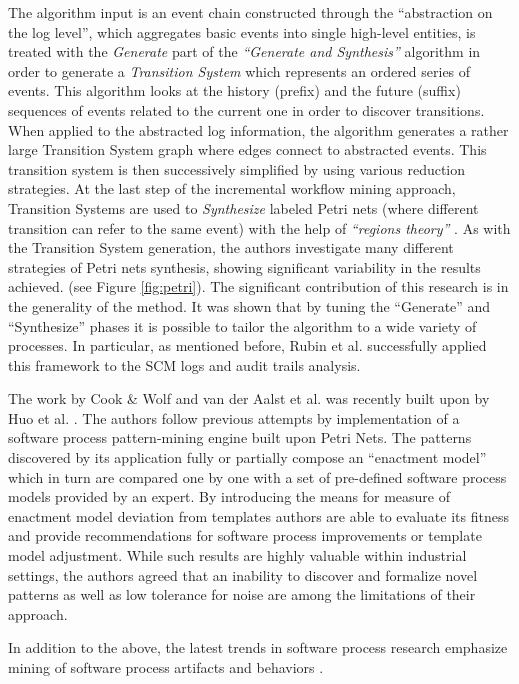 \documentclass{sig-alternate}
\begin{document}
The algorithm input is an event chain constructed through the ``abstraction on the log level'', which aggregates basic events into single high-level entities, is treated with the \textit{Generate} part of the \textit{``Generate and Synthesis''} \cite{citeulike:3718014} algorithm in order to generate a \textit{Transition System} which represents an ordered series of events. This algorithm looks at the history (prefix) and the future (suffix) sequences of events related to the current one in order to discover transitions.  When applied to the abstracted log information, the algorithm generates a rather large Transition System graph where edges connect to abstracted events. This transition system is then successively simplified by using various reduction strategies. At the last step of the incremental workflow mining approach, Transition Systems are used to \textit{Synthesize} labeled Petri nets (where different transition can refer to the same event) with the help of \textit{``regions theory''} \cite{citeulike:5128170}. As with the Transition System generation, the authors investigate many different strategies of Petri nets synthesis, showing significant variability in the results achieved. (see Figure \ref{fig:petri}). The significant contribution of this research is in the generality of the method. It was shown that by tuning the ``Generate'' and ``Synthesize'' phases it is possible to tailor the algorithm to a wide variety of processes. In particular, as mentioned before, Rubin et al. successfully applied this framework to the SCM logs and audit trails analysis.

The work by Cook \& Wolf and van der Aalst et al. was recently built upon by Huo et al. \cite{citeulike:7690766} \cite{citeulike:7691059}. The authors follow previous attempts by implementation of a software process pattern-mining engine built upon Petri Nets. The patterns discovered by its application fully or partially compose an ``enactment model'' which in turn are compared one by one with a set of pre-defined software process models provided by an expert. By introducing the means for measure of enactment model deviation from templates authors are able to evaluate its fitness and provide recommendations for software process improvements or template model adjustment. While such results are highly valuable within industrial settings, the authors agreed that an inability to discover and formalize novel patterns as well as low tolerance for noise are among the limitations of their approach.

In addition to the above, the latest trends in software process research emphasize mining of software process artifacts and behaviors \cite{citeulike:2678511} \cite{citeulike:5043664} \cite{citeulike:5112229}. 
\end{document}
